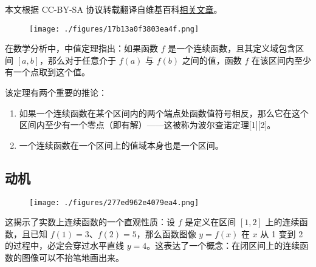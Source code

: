 
本文根据 CC-BY-SA 协议转载翻译自维基百科\href{https://en.wikipedia.org/wiki/Intermediate_value_theorem}{相关文章}。

\begin{figure}[ht]
\centering
\texttt{[image: ./figures/17b13a0f3803ea4f.png]}
\caption{} \label{fig_JZDL_1}
\end{figure}
在数学分析中，中值定理指出：如果函数 $f$ 是一个连续函数，且其定义域包含区间 $[a, b]$，那么对于任意介于 $f(a)$ 与 $f(b)$ 之间的值，函数 $f$ 在该区间内至少有一个点取到这个值。

该定理有两个重要的推论：
\begin{enumerate}
\item 如果一个连续函数在某个区间内的两个端点处函数值符号相反，那么它在这个区间内至少有一个零点（即有解）——这被称为波尔查诺定理[1][2]。
\item 一个连续函数在一个区间上的值域本身也是一个区间。
\end{enumerate}
\subsection{动机}
\begin{figure}[ht]
\centering
\texttt{[image: ./figures/277ed962e4079ea4.png]}
\caption{} \label{fig_JZDL_2}
\end{figure}
这揭示了实数上连续函数的一个直观性质：设 $f$ 是定义在区间 $[1, 2]$ 上的连续函数，且已知 $f(1) = 3$、$f(2) = 5$，那么函数图像 $y = f(x)$ 在 $x$ 从 1 变到 2 的过程中，必定会穿过水平直线 $y = 4$。这表达了一个概念：在闭区间上的连续函数的图像可以不抬笔地画出来。
